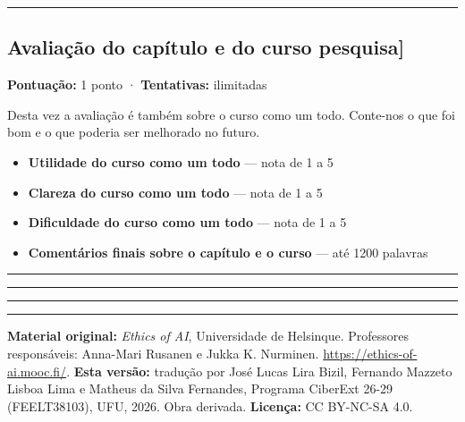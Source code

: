 \documentclass[
  11pt,
]{article}
\providecommand{\tightlist}{%
  \setlength{\itemsep}{0pt}\setlength{\parskip}{0pt}}
\newcommand{\faixaEixos}[1][\linewidth]{%
  \noindent
  \textcolor{iaConceitos}{\rule{0.3333#1}{4pt}}%
  \textcolor{iaAplic}{\rule{0.3333#1}{4pt}}%
  \textcolor{iaRiscos}{\rule{0.3333#1}{4pt}}%
  \par}
\renewcommand{\texttt}[1]{{\color{iaAmeixa}\small\ttfamily #1}}
\newenvironment{licenca}
  {\par\vspace{2em}\faixaEixos\par\vspace{0.8em}
   \begingroup\sffamily\scriptsize\color{iaTintaFraca}}
  {\endgroup\par}
\begin{document}
\begin{center}\rule{0.5\linewidth}{0.5pt}\end{center}

\hypertarget{avaliauxe7uxe3o-do-capuxedtulo-e-do-curso-pesquisa}{%
\subsection{\texorpdfstring{Avaliação do capítulo e do curso
\texttt{{[}pesquisa{]}}}{Avaliação do capítulo e do curso {[}pesquisa{]}}}\label{avaliauxe7uxe3o-do-capuxedtulo-e-do-curso-pesquisa}}

\textbf{Pontuação:} 1 ponto · \textbf{Tentativas:} ilimitadas

Desta vez a avaliação é também sobre o curso como um todo. Conte-nos o
que foi bom e o que poderia ser melhorado no futuro.

\begin{itemize}
\tightlist
\item
  \textbf{Utilidade do curso como um todo} --- nota de 1 a 5
\item
  \textbf{Clareza do curso como um todo} --- nota de 1 a 5
\item
  \textbf{Dificuldade do curso como um todo} --- nota de 1 a 5
\item
  \textbf{Comentários finais sobre o capítulo e o curso} --- até 1200
  palavras
\end{itemize}

\begin{center}\rule{0.5\linewidth}{0.5pt}\end{center}

\begin{licenca}

\textbf{Material original:} \emph{Ethics of AI}, Universidade de
Helsinque. Professores responsáveis: Anna-Mari Rusanen e Jukka K.
Nurminen. \url{https://ethics-of-ai.mooc.fi/}. \textbf{Esta versão:}
tradução por José Lucas Lira Bizil, Fernando Mazzeto Lisboa Lima e
Matheus da Silva Fernandes, Programa CiberExt 26-29 (FEELT38103), UFU,
2026. Obra derivada. \textbf{Licença:} CC BY-NC-SA 4.0.

\end{licenca}
\end{document}

